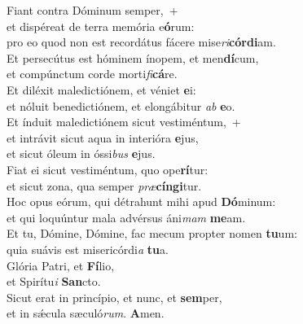 \evenverse Fiant contra Dóminum semper,~+\\\evenverse  et dispéreat de terra memória e\textbf{ó}rum:~\*\\
\evenverse pro eo quod non est recordátus fácere mise\textit{ri}\textbf{cór}\textbf{di}am.\\
\oddverse Et persecútus est hóminem ínopem, et men\textbf{dí}cum,~\*\\
\oddverse et compúnctum corde morti\textit{fi}\textbf{cá}re.\\
\evenverse Et diléxit maledictiónem, et véniet \textbf{e}i:~\*\\
\evenverse et nóluit benedictiónem, et elongábitur \textit{ab} \textbf{e}o.\\
\oddverse Et índuit maledictiónem sicut vestiméntum,~+\\
\oddverse  et intrávit sicut aqua in interióra \textbf{e}jus,~\*\\
\oddverse et sicut óleum in óssi\textit{bus} \textbf{e}jus.\\
\evenverse Fiat ei sicut vestiméntum, quo ope\textbf{rí}tur:~\*\\
\evenverse et sicut zona, qua semper \textit{præ}\textbf{cín}\textbf{gi}tur.\\
\oddverse Hoc opus eórum, qui détrahunt mihi apud \textbf{Dó}minum:~\*\\
\oddverse et qui loquúntur mala advérsus áni\textit{mam} \textbf{me}am.\\
\evenverse Et tu, Dómine, Dómine, fac mecum propter nomen \textbf{tu}um:~\*\\
\evenverse quia suávis est misericórdi\textit{a} \textbf{tu}a.\\
\oddverse Glória Patri, et \textbf{Fí}lio,~\*\\
\oddverse et Spirítu\textit{i} \textbf{San}cto.\\
\evenverse Sicut erat in princípio, et nunc, et \textbf{sem}per,~\*\\
\evenverse et in sǽcula sæculó\textit{rum}. \textbf{A}men.\\
